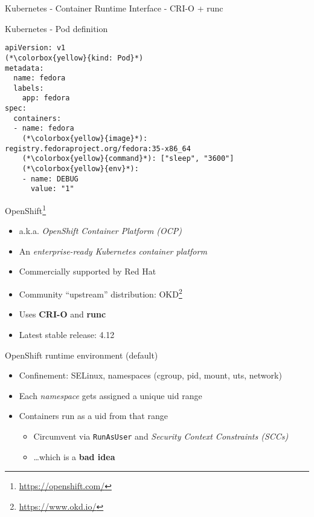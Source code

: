\documentclass[ignorenonframetext,aspectratio=169,12pt]{beamer}
\def\svgwidth{4cm}
\begin{document}
\begin{frame}{Kubernetes - Container Runtime Interface - CRI-O + runc}
\begin{center}
\def\svgwidth{\textwidth}

\end{center}
\end{frame}

\begin{frame}[fragile]{Kubernetes - Pod definition}
\protect\hypertarget{kubernetes-pod-spec}{}
\begin{lstlisting}
apiVersion: v1
(*\colorbox{yellow}{kind: Pod}*)
metadata:
  name: fedora
  labels:
    app: fedora
spec:
  containers:
  - name: fedora
    (*\colorbox{yellow}{image}*): registry.fedoraproject.org/fedora:35-x86_64
    (*\colorbox{yellow}{command}*): ["sleep", "3600"]
    (*\colorbox{yellow}{env}*):
    - name: DEBUG
      value: "1"
\end{lstlisting}
\end{frame}

\begin{frame}{OpenShift\footnote{\url{https://openshift.com/}}}
\protect\hypertarget{openshift-intro}{}
\begin{itemize}
\item a.k.a. {\em OpenShift Container Platform (OCP)}
\item An {\em enterprise-ready Kubernetes container platform}
\item Commercially supported by Red Hat
\item Community ``upstream'' distribution: OKD\footnote{\url{https://www.okd.io/}}
\item Uses {\bf CRI-O} and {\bf runc}
\item Latest stable release: 4.12
\end{itemize}
\end{frame}

\begin{frame}{OpenShift runtime environment (default)}
\protect\hypertarget{openshift-runtime-today}{}
\begin{itemize}
\item Confinement: SELinux, namespaces (cgroup, pid, mount, uts, network)
\item Each {\em namespace} gets assigned a unique uid range
\item Containers run as a uid from that range
    \begin{itemize}
      \item Circumvent via {\tt RunAsUser} and {\em Security Context
        Constraints (SCCs)}
      \item \dots{}which is a {\bf bad idea}
    \end{itemize}
\end{itemize}
\end{frame}
\end{document}
